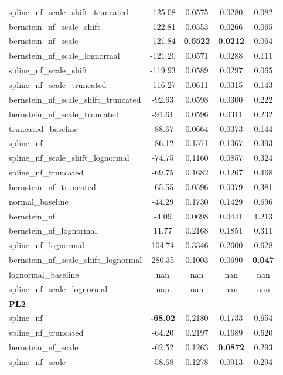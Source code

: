 \begin{table}[t]
\begin{tabular}{lcccc}
  spline\_nf\_scale\_shift\_truncated & -125.08 & 0.0575 & 0.0280 & 0.082 \\
  bernstein\_nf\_scale\_shift & -122.81 & 0.0553 & 0.0266 & 0.065 \\
  bernstein\_nf\_scale & -121.84 & \textbf{0.0522} & \textbf{0.0212} & 0.064 \\
  bernstein\_nf\_scale\_lognormal & -121.20 & 0.0571 & 0.0288 & 0.111 \\
  spline\_nf\_scale\_shift & -119.93 & 0.0589 & 0.0297 & 0.065 \\
  spline\_nf\_scale\_truncated & -116.27 & 0.0611 & 0.0315 & 0.143 \\
  bernstein\_nf\_scale\_shift\_truncated & -92.63 & 0.0598 & 0.0300 & 0.222 \\
  bernstein\_nf\_scale\_truncated & -91.61 & 0.0596 & 0.0311 & 0.232 \\
  truncated\_baseline & -88.67 & 0.0664 & 0.0373 & 0.144 \\
  spline\_nf & -86.12 & 0.1571 & 0.1367 & 0.393 \\
  spline\_nf\_scale\_shift\_lognormal & -74.75 & 0.1160 & 0.0857 & 0.324 \\
  spline\_nf\_truncated & -69.75 & 0.1682 & 0.1267 & 0.468 \\
  bernstein\_nf\_truncated & -65.55 & 0.0596 & 0.0379 & 0.381 \\
  normal\_baseline & -44.29 & 0.1730 & 0.1429 & 0.696 \\
  bernstein\_nf & -4.09 & 0.0698 & 0.0441 & 1.213 \\
  bernstein\_nf\_lognormal & 11.77 & 0.2168 & 0.1851 & 0.311 \\
  spline\_nf\_lognormal & 104.74 & 0.3346 & 0.2600 & 0.628 \\
  bernstein\_nf\_scale\_shift\_lognormal & 280.35 & 0.1003 & 0.0690 & \textbf{0.047} \\
  lognormal\_baseline & nan & nan & nan & nan \\
  spline\_nf\_scale\_lognormal & nan & nan & nan & nan \\
\midrule
\multicolumn{5}{l}{\textbf{PL2}} \\
  spline\_nf & \textbf{-68.02} & 0.2180 & 0.1733 & 0.654 \\
  spline\_nf\_truncated & -64.20 & 0.2197 & 0.1689 & 0.620 \\
  bernstein\_nf\_scale & -62.52 & 0.1263 & \textbf{0.0872} & 0.293 \\
  spline\_nf\_scale & -58.68 & 0.1278 & 0.0913 & 0.294 \\

\end{tabular}
\end{table}
